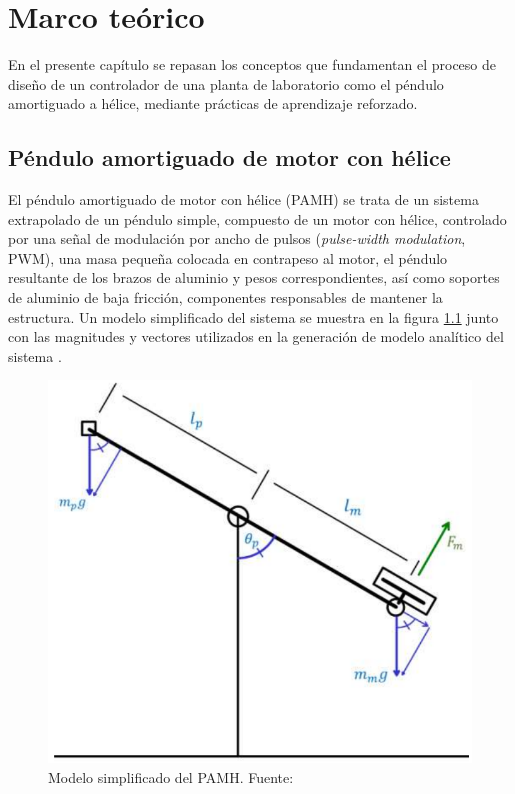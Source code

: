 \chapter{Marco teórico}
\label{ch:teoria}

En el presente capítulo se repasan los conceptos que fundamentan el proceso de diseño de un controlador de una planta de laboratorio como el péndulo amortiguado a hélice, mediante prácticas de aprendizaje reforzado.

\section{Péndulo amortiguado de motor con hélice}

El péndulo amortiguado de motor con hélice (PAMH) se trata de un sistema extrapolado de un péndulo simple, compuesto de un motor con hélice, controlado por una señal de modulación por ancho de pulsos (\textit{pulse-width modulation}, PWM), una masa pequeña colocada en contrapeso al motor, el péndulo resultante de los brazos de aluminio y pesos correspondientes, así como soportes de aluminio de baja fricción, componentes responsables de mantener la estructura. Un modelo simplificado del sistema se muestra en la figura \ref{fig:modpen} junto con las magnitudes y vectores utilizados en la generación de modelo analítico del sistema \cite{PAMH1}.

\begin{figure}[h]
	\centering
	\includegraphics[scale=0.3]{fig/new/ModeloPendulo.png}
	\caption{Modelo simplificado del PAMH. Fuente: \cite{PAMHppt}}
	\label{fig:modpen}
\end{figure}

